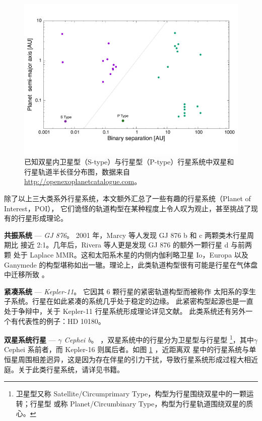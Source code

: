 \begin{figure}[b]
\centering
\includegraphics[width=1.0\textwidth]{figures/chapter1/fig14_binaryplanet.pdf}
\caption{已知双星内卫星型（S-type）与行星型（P-type）行星系统中双星和行星轨道半长径分布图，数据来自 \url{http://openexoplanetcatalogue.com}。}
\label{fig:pibinary}
\end{figure}

除了以上三大类系外行星系统，本文额外汇总了一些有趣的行星系统（Planet of Interest，POI），
它们诡怪的轨道构型在某种程度上令人叹为观止，甚至挑战了现有的行星形成理论。

\textbf{共振系统} --- \textit{GJ 876}。  {} 2001 年，Marcy 等人发现 GJ 876 b 和 c 两颗类木行星周期比
接近 2:1\cite{Marcy2001}。几年后，Rivera 等人更是发现 GJ 876 的额外一颗行星 d 与前两颗
处于 Laplace MMR\cite{Rivera2010}。这和太阳系木星的内侧内伽利略卫星 Io，Europa 以及 
Ganymede 的构型堪称如出一辙。理论上，此类轨道构型很有可能是行星在气体盘中迁移所致
\cite{KleyNelson2012,ZhangZhou2010}。

\textbf{紧凑系统} --- \textit{Kepler-11}。  {} 它因其 6 颗行星的紧密轨道构型\cite{Lissauer2011}而被称作
太阳系的孪生子系统\cite{Zhou2012}。行星在如此紧凑的系统几乎处于稳定的边缘\cite{Mahajan2014}。
此紧密构型起源也是一直处于争辩中，关于 Kepler-11 行星系统形成理论详见文献。
此类系统还有另外一个有代表性的例子：HD 10180\cite{Lovis2011}。

\textbf{双星系统行星} --- \textit{$\gamma$ Cephei b}。  {} ，双星系统中的行星分为卫星型与行星型
\footnote{卫星型又称 Satellite/Circumprimary Type，构型为行星围绕双星中的一颗运转；行星型
或称 Planet/Circumbinary Type，构型为行星轨道围绕双星的质心。}，其中$\gamma$ Cephei
\cite{Hatzes2003} 系前者，而 Kepler-16\cite{Doyle2011} 则属后者。如图 \ref{fig:pibinary} ，近距离双
星中的行星系统与单恒星周围相差迥异，这是因为存在伴星的引力干扰，导致行星系统形成过程大相近
庭。关于此类行星系统，请详见书籍。

